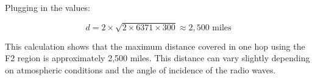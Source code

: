 Plugging in the values:

\[
d = 2 \times \sqrt{2 \times 6371 \times 300} \approx 2,500 \text{ miles}
\]

This calculation shows that the maximum distance covered in one hop using the F2 region is approximately 2,500 miles. This distance can vary slightly depending on atmospheric conditions and the angle of incidence of the radio waves.

